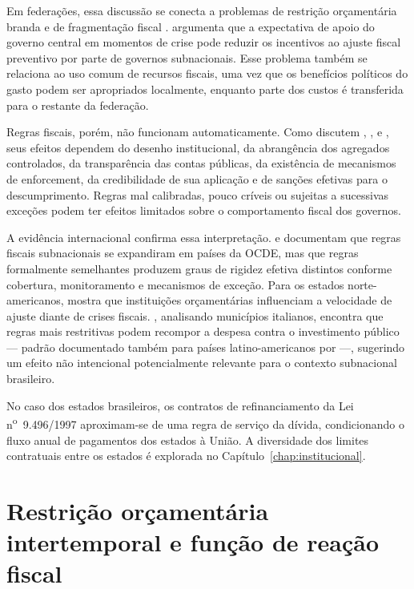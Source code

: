 Em federações, essa discussão se conecta a problemas de restrição orçamentária branda \cite{kornaiSoftBudgetConstraint1986} e de fragmentação fiscal \cite{velasco2000}.  argumenta que a expectativa de apoio do governo central em momentos de crise pode reduzir os incentivos ao ajuste fiscal preventivo por parte de governos subnacionais. Esse problema também se relaciona ao uso comum de recursos fiscais, uma vez que os benefícios políticos do gasto podem ser apropriados localmente, enquanto parte dos custos é transferida para o restante da federação. 

Regras fiscais, porém, não funcionam automaticamente. Como discutem , ,  e , seus efeitos dependem do desenho institucional, da abrangência dos agregados controlados, da transparência das contas públicas, da existência de mecanismos de enforcement, da credibilidade de sua aplicação e de sanções efetivas para o descumprimento. Regras mal calibradas, pouco críveis ou sujeitas a sucessivas exceções podem ter efeitos limitados sobre o comportamento fiscal dos governos.

A evidência internacional confirma essa interpretação.  e  documentam que regras fiscais subnacionais se expandiram em países da OCDE, mas que regras formalmente semelhantes produzem graus de rigidez efetiva distintos conforme cobertura, monitoramento e mecanismos de exceção. Para os estados norte-americanos,  mostra que instituições orçamentárias influenciam a velocidade de ajuste diante de crises fiscais. , analisando municípios italianos, encontra que regras mais restritivas podem recompor a despesa contra o investimento público — padrão documentado também para países latino-americanos por  —, sugerindo um efeito não intencional potencialmente relevante para o contexto subnacional brasileiro.

No caso dos estados brasileiros, os contratos de refinanciamento da Lei n\textsuperscript{o}~9.496/1997 aproximam-se de uma regra de serviço da dívida, condicionando o fluxo anual de pagamentos dos estados à União. A diversidade dos limites contratuais entre os estados é explorada no Capítulo~\ref{chap:institucional}.


\section{Restrição orçamentária intertemporal e função de reação fiscal}

